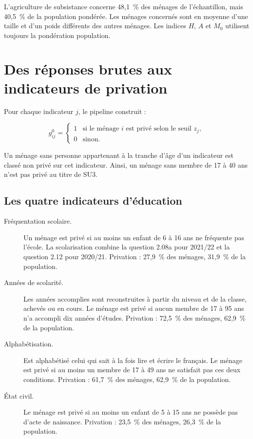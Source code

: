 \documentclass[11pt,a4paper]{article}
\begin{document}
\begin{attention}
L'agriculture de subsistance concerne 48,1~\% des ménages de l'échantillon, mais 40,5~\% de la
population pondérée. Les ménages concernés sont en moyenne d'une taille et d'un poids différents
des autres ménages. Les indices $H$, $A$ et $M_0$ utilisent toujours la pondération population.
\end{attention}

\section{Des réponses brutes aux indicateurs de privation}

Pour chaque indicateur $j$, le pipeline construit :

\[
g^0_{ij} =
\begin{cases}
1 & \text{si le ménage } i \text{ est privé selon le seuil } z_j,\\
0 & \text{sinon.}
\end{cases}
\]

Un ménage sans personne appartenant à la tranche d'âge d'un indicateur est classé non privé sur
cet indicateur. Ainsi, un ménage sans membre de 17 à 40 ans n'est pas privé au titre de SU3.

\subsection{Les quatre indicateurs d'éducation}

\begin{description}
  \item[Fréquentation scolaire.] Un ménage est privé si au moins un enfant de 6 à 16 ans ne
  fréquente pas l'école. La scolarisation combine la question 2.08a pour 2021/22 et la question
  2.12 pour 2020/21. Privation : 27,9~\% des ménages, 31,9~\% de la population.

  \item[Années de scolarité.] Les années accomplies sont reconstruites à partir du niveau et de
  la classe, achevés ou en cours. Le ménage est privé si aucun membre de 17 à 95 ans n'a accompli
  dix années d'études. Privation : 72,5~\% des ménages, 62,9~\% de la population.

  \item[Alphabétisation.] Est alphabétisé celui qui sait à la fois lire et écrire le français.
  Le ménage est privé si au moins un membre de 17 à 49 ans ne satisfait pas ces deux conditions.
  Privation : 61,7~\% des ménages, 62,9~\% de la population.

  \item[État civil.] Le ménage est privé si au moins un enfant de 5 à 15 ans ne possède pas
  d'acte de naissance. Privation : 23,5~\% des ménages, 26,3~\% de la population.
\end{description}
\end{document}
